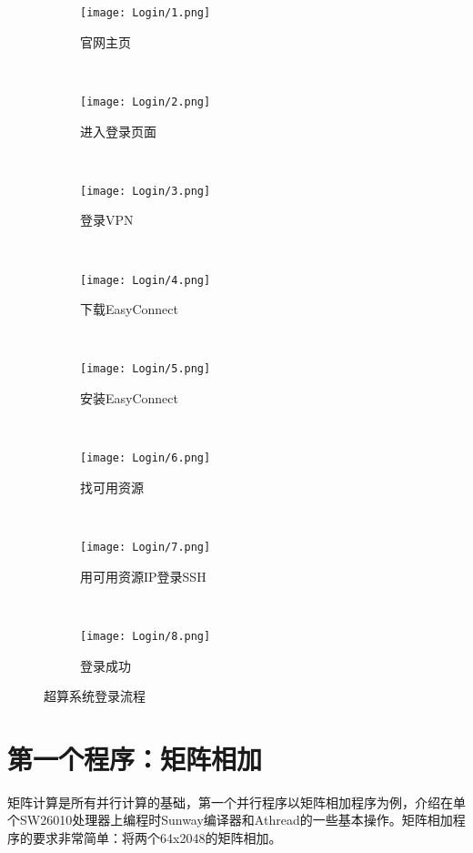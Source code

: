 \begin{figure}[!htbp]
    \centering
    \begin{subfigure}[b]{0.49\textwidth}
      \texttt{[image: Login/1.png]}
      \caption{官网主页}
      \label{fig:登录步骤1}
    \end{subfigure}%
    ~%
    \begin{subfigure}[b]{0.49\textwidth}
      \texttt{[image: Login/2.png]}
      \caption{进入登录页面}
      \label{fig:登录步骤2}
    \end{subfigure}
    \\%
    \begin{subfigure}[b]{0.49\textwidth}
      \texttt{[image: Login/3.png]}
      \caption{登录VPN}
      \label{fig:登录步骤3}
    \end{subfigure}%
    ~%
    \begin{subfigure}[b]{0.49\textwidth}
      \texttt{[image: Login/4.png]}
      \caption{下载EasyConnect}
      \label{fig:登录步骤4}
    \end{subfigure}
    \\%
    \begin{subfigure}[b]{0.49\textwidth}
      \texttt{[image: Login/5.png]}
      \caption{安装EasyConnect}
      \label{fig:登录步骤5}
    \end{subfigure}%
    ~%
    \begin{subfigure}[b]{0.49\textwidth}
      \texttt{[image: Login/6.png]}
      \caption{找可用资源}
      \label{fig:登录步骤6}
    \end{subfigure}
    \\%
    \begin{subfigure}[b]{0.49\textwidth}
      \texttt{[image: Login/7.png]}
      \caption{用可用资源IP登录SSH}
      \label{fig:登录步骤7}
    \end{subfigure}%
    ~%
    \begin{subfigure}[b]{0.49\textwidth}
      \texttt{[image: Login/8.png]}
      \caption{登录成功}
      \label{fig:登录步骤8}
    \end{subfigure}
    \caption{超算系统登录流程}
    \label{fig:oaspl}
\end{figure}

\section{第一个程序：矩阵相加}
矩阵计算是所有并行计算的基础，第一个并行程序以矩阵相加程序为例，介绍在单个SW26010处理器上编程时Sunway编译器和Athread的一些基本操作。矩阵相加程序的要求非常简单：将两个64x2048的矩阵相加。

